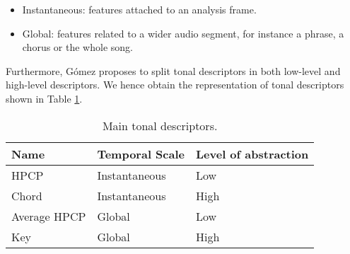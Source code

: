 \begin{itemize}
\item Instantaneous: features attached to an analysis frame.
\item Global: features related to a wider audio segment, for instance a phrase, a chorus or the whole song.
\end{itemize}
Furthermore, Gómez proposes to split tonal descriptors in both low-level and high-level descriptors. We hence obtain the representation of tonal descriptors shown in Table \ref{table:tonaldescriptors}.
\begin{table}[h]
\begin{center}
\begin{tabular} { l l l }
\hline
Name         & Temporal Scale & Level of abstraction \\ \hline
HPCP         & Instantaneous  & Low                  \\ 
Chord        & Instantaneous  & High                 \\ 
Average HPCP & Global         & Low                  \\ 
Key          & Global         & High                 \\ \hline
\end{tabular}
\caption{Main tonal descriptors.}
\label{table:tonaldescriptors}
\end{center}
\end{table}


